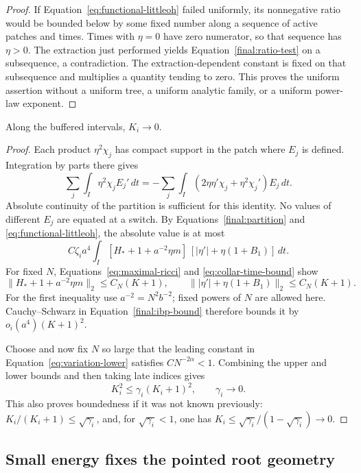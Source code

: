 \begin{proof}
If Equation~\eqref{eq:functional-littleoh} failed uniformly, its
nonnegative ratio would be bounded below by some fixed number
along a sequence of active patches and times.  Times with $\eta=0$
have zero numerator, so that sequence has $\eta>0$.  The extraction
just performed yields Equation~\eqref{final:ratio-test} on a
subsequence, a contradiction.  The extraction-dependent constant
is fixed on that subsequence and multiplies a quantity tending to
zero.  This proves the uniform assertion without a uniform tree,
a uniform analytic family, or a uniform power-law exponent.
\end{proof}

\begin{corollary}\label{final:energy-vanishes}
Along the buffered intervals, $K_i\to0$.
\end{corollary}

\begin{proof}
Each product $\eta^2\chi_j$ has compact support in the patch where
$E_j$ is defined.  Integration by parts there gives
\[
 \sum_j\int_I\eta^2\chi_j E_j'\,dt
 =-\sum_j\int_I
       (2\eta\eta'\chi_j+\eta^2\chi_j')E_j\,dt.
\]
Absolute continuity of the partition is sufficient for this identity.
No values of different $E_j$ are equated at a switch.  By
Equations~\eqref{final:partition} and \eqref{eq:functional-littleoh},
the absolute value is at most
\begin{equation}\label{final:ibp-bound}
 C\zeta_i a^4\int_I
 [H_*+1+a^{-2}\eta m]\,[|\eta'|+\eta(1+B_1)]\,dt.
\end{equation}
For fixed $N$, Equations~\eqref{eq:maximal-ricci} and
\eqref{eq:collar-time-bound} show
\[
 \|H_*+1+a^{-2}\eta m\|_2\le C_N(K+1),\qquad
 \||\eta'|+\eta(1+B_1)\|_2\le C_N(K+1).
\]
For the first inequality use $a^{-2}=N^2b^{-2}$; fixed powers of
$N$ are allowed here.  Cauchy--Schwarz in
Equation~\eqref{final:ibp-bound} therefore bounds it by
$o_i(a^4)(K+1)^2$.

Choose and now fix $N$ so large that the leading constant in
Equation~\eqref{eq:variation-lower} satisfies $CN^{-2\alpha}<1$.
Combining the upper and lower bounds and then taking late indices
gives
\[
 K_i^2\le\gamma_i(K_i+1)^2,\qquad\gamma_i\longrightarrow0.
\]
This also proves boundedness if it was not known previously:
$K_i/(K_i+1)\le\sqrt{\gamma_i}$, and, for
$\sqrt{\gamma_i}<1$, one has
$K_i\le\sqrt{\gamma_i}/(1-\sqrt{\gamma_i})\to0$.
\end{proof}

\subsection{Small energy fixes the pointed root geometry}

